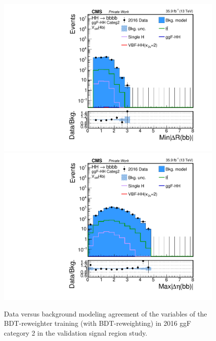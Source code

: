 \begin{figure}[htbp!]
\begin{center}
\includegraphics[width=0.24\linewidth]{Figures/Modeling/background/plotsDatadrivenWithBDT/2016/GGFcateg2_SR_210/Histogram/plot2016_min_4b_deltaR_Btag4_GGFcateg2_SR_210_Histogram_log.pdf}
\includegraphics[width=0.24\linewidth]{Figures/Modeling/background/plotsDatadrivenWithBDT/2016/GGFcateg2_SR_210/Histogram/plot2016_max_4b_deltaEta_Btag4_GGFcateg2_SR_210_Histogram_log.pdf}
\end{center}
\caption{Data versus background modeling agreement of the variables of the BDT-reweighter training (with BDT-reweighting) in 2016 ggF category 2 in the validation signal region study.}
\label{bkg:fig:valsrbdtregvarggf2_2016}
\end{figure}

